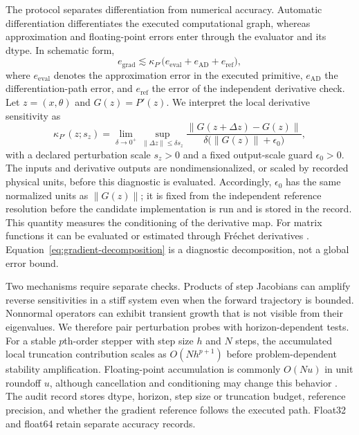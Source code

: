 \documentclass[preprint,12pt]{elsarticle}
\begin{document}
The protocol separates differentiation from numerical accuracy. Automatic differentiation differentiates the executed computational graph, whereas approximation and floating-point errors enter through the evaluator and its dtype. In schematic form,
\begin{equation}
 e_{\mathrm{grad}} \lesssim
 \kappa_{P'}\bigl(e_{\mathrm{eval}}+e_{\mathrm{AD}}+e_{\mathrm{ref}}\bigr),
 \label{eq:gradient-decomposition}
\end{equation}
where $e_{\mathrm{eval}}$ denotes the approximation error in the executed primitive, $e_{\mathrm{AD}}$ the differentiation-path error, and $e_{\mathrm{ref}}$ the error of the independent derivative check. Let $z=(x,\theta)$ and $G(z)=P'(z)$. We interpret the local derivative sensitivity as
\begin{equation}
 \kappa_{P'}(z;s_z)=\lim_{\delta\to0^+}\sup_{\|\Delta z\|\leq\delta s_z}
 \frac{\|G(z+\Delta z)-G(z)\|}{\delta\bigl(\|G(z)\|+\epsilon_0\bigr)},
 \label{eq:derivative-condition}
\end{equation}
with a declared perturbation scale $s_z>0$ and a fixed output-scale guard $\epsilon_0>0$. The inputs and derivative outputs are nondimensionalized, or scaled by recorded physical units, before this diagnostic is evaluated. Accordingly, $\epsilon_0$ has the same normalized units as $\|G(z)\|$; it is fixed from the independent reference resolution before the candidate implementation is run and is stored in the record. This quantity measures the conditioning of the derivative map. For matrix functions it can be evaluated or estimated through Fr\'echet derivatives \citep{higham2008functions,higham2014frechet}. Equation~\eqref{eq:gradient-decomposition} is a diagnostic decomposition, not a global error bound.

Two mechanisms require separate checks. Products of step Jacobians can amplify reverse sensitivities in a stiff system even when the forward trajectory is bounded. Nonnormal operators can exhibit transient growth that is not visible from their eigenvalues. We therefore pair perturbation probes with horizon-dependent tests. For a stable $p$th-order stepper with step size $h$ and $N$ steps, the accumulated local truncation contribution scales as $O(Nh^{p+1})$ before problem-dependent stability amplification. Floating-point accumulation is commonly $O(Nu)$ in unit roundoff $u$, although cancellation and conditioning may change this behavior \citep{higham2002accuracy}. The audit record stores dtype, horizon, step size or truncation budget, reference precision, and whether the gradient reference follows the executed path. Float32 and float64 retain separate accuracy records.
\end{document}
